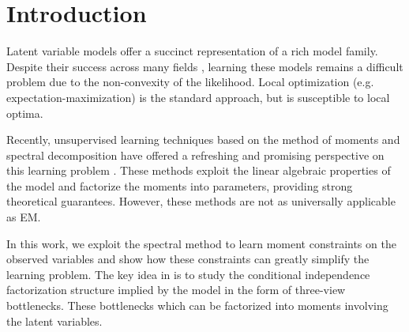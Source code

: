 \documentclass{article}
\begin{document}
 


\begin{abstract} 
\end{abstract} 

\section{Introduction}
\label{sec:introduction}

Latent variable models offer a succinct representation of a rich model
family. 
Despite their success across many fields
\cite{quattoni04crf,haghighi06prototype,liang06discrimative,kirkpatrick10painless},
learning these models remains a difficult problem due to the
non-convexity of the likelihood. Local optimization (e.g.
expectation-maximization) is the standard approach, but is susceptible
to local optima.

Recently, unsupervised learning techniques based on the method of moments and
spectral decomposition have offered a refreshing and promising perspective on
this learning problem \citep{hsu09spectral,anandkumar11tree,anandkumar12moments,anandkumar12lda,hsu12identifiability,balle11transducer,balle12automata}.
These methods exploit the linear algebraic properties of the model and
factorize the moments into parameters, providing strong theoretical guarantees.
However, these methods are not as universally applicable as EM.

In this work, we exploit the spectral method to learn moment constraints
on the observed variables and show how these constraints can greatly
simplify the learning problem.
The key idea in
\citet{anandkumar12moments,anandkumar13tensor} is to study the conditional
independence factorization structure implied by the model in the form of 
three-view bottlenecks. These bottlenecks which can be factorized into
moments involving the latent variables\vague.
\end{document}
